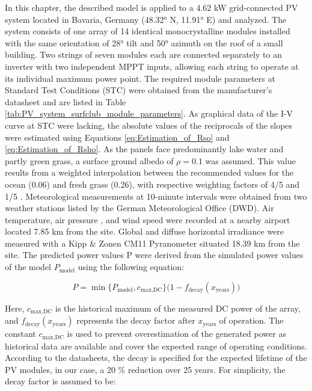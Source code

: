 
In this chapter, the described model is applied to a 4.62 kW grid-connected
PV system located in Bavaria, Germany (48.32° N, 11.91° E) and analyzed. The system
consists of one array of 14 identical monocrystalline modules installed
with the same orientation of 28° tilt and 50° azimuth on the roof of a
small building. Two strings of seven modules each are connected separately
to an inverter with two independent MPPT inputs, allowing each string to
operate at its individual maximum power point. The required module parameters
at Standard Test Conditions (STC) were obtained from the manufacturer's datasheet
and are listed in Table \ref{tab:PV_system_surfclub_module_parameters}.
As graphical data of the I-V curve at STC were lacking, the absolute
values of the reciprocals of the slopes were estimated using Equations
\ref{eq:Estimation_of_Rso} and \ref{eq:Estimation_of_Rsho}. As
the panels face predominantly lake water and partly
green grass, a surface ground albedo of \(\rho = 0.1\) was assumed.
This value results from a weighted interpolation between the
recommended values for the ocean (0.06) and fresh grass (0.26),
with respective weighting factors of 4/5 and 1/5 \cite{OceanAlbedoWebsite}.
Meteorological measurements at 10-minute intervals were obtained from
two weather stations listed by the German Meteorological Office (DWD).
Air temperature, air pressure \cite{DWD_munich_airport_temperature_and_pressure},
and wind speed \cite{DWD_munich_airport_wind_speed} were recorded at a
nearby airport located 7.85 km from the site. Global and diffuse
horizontal irradiance \cite{DWD_weiherstephan_irradiance} were
measured with a Kipp \& Zonen CM11 Pyranometer situated 18.39 km from
the site. The predicted power values P were derived from the simulated
power values of the model \(P_{\text{model}}\) using the following equation:

\begin{equation}
    P = \min \bigl\{ P_{\text{model}}, c_{\text{max,DC}} \bigr\} \bigl(1 - f_{\text{decay}}(x_{\text{years}})\bigr)
    \label{eq:Power_prediction_from_the_model_output}
\end{equation}

\noindent
Here, \(c_{\text{max,DC}}\) is the historical maximum of the
measured DC power of the array, and \(f_{\text{decay}}(x_{\text{years}})\)
represents the decay factor after \(x_{\text{years}}\) of operation.
The constant \(c_{\text{max,DC}}\) is used to prevent overestimation of the
generated power as historical data are available and cover the
expected range of operating conditions. According to the datasheets,
the decay is specified for the expected lifetime of the PV modules,
in our case, a 20 \% reduction over 25 years. For simplicity, the decay factor
is assumed to be:

